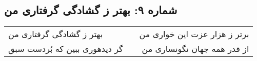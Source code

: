 \begin{center}
\section*{شماره ۹: بهتر ز گشادگی گرفتاری من}
\label{sec:009}
\begin{longtable}{l p{0.5cm} r}
بهتر ز گشادگی گرفتاری من
&&
برتر ز هزار عزت این خواری من
\\
گر دیدهوری ببین که بُردست سبق
&&
از قدر همه جهان نگونساری من
\\
\end{longtable}
\end{center}
